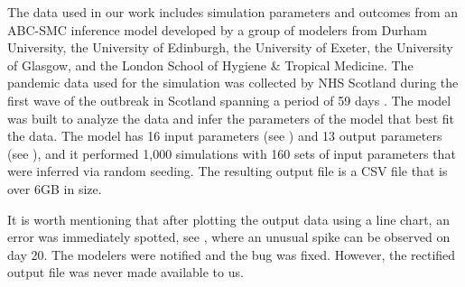 The data used in our work includes simulation parameters and outcomes from an \ac{ABC-SMC} inference model \cite{toni2008Approximate} developed by a group of modelers from Durham University, the University of Edinburgh, the University of Exeter, the University of Glasgow, and the London School of Hygiene \& Tropical Medicine.
The pandemic data used for the simulation was collected by NHS Scotland during the first wave of the outbreak in Scotland spanning a period of 59 days \cite{2020Covid19}.
The model was built to analyze the data and infer the parameters of the model that best fit the data.
The model has 16 input parameters (see ) and 13 output parameters (see ), and it performed 1,000 simulations with 160 sets of input parameters that were inferred via random seeding.
The resulting output file is a CSV file that is over 6GB in size.

It is worth mentioning that after plotting the output data using a line chart, an error was immediately spotted, see , where an unusual spike can be observed on day 20.
The modelers were notified and the bug was fixed.
However, the rectified output file was never made available to us.
